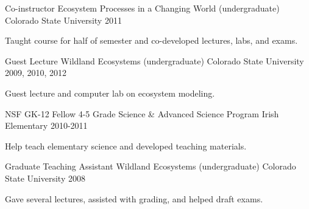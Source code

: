 \begin{cventries}
  \cventry
    {Co-instructor} %
    {Ecosystem Processes in a Changing World (undergraduate)} %
    {Colorado State University} %
    {2011} %
    {
      \begin{cvitems} %
        \item {Taught course for half of semester and co-developed lectures, labs, and exams.}
      \end{cvitems}
    }

  \cventry
    {Guest Lecture} %
    {Wildland Ecosystems (undergraduate)} %
    {Colorado State University} %
    {2009, 2010, 2012} %
    {
      \begin{cvitems} %
        \item {Guest lecture and computer lab on ecosystem modeling.}
      \end{cvitems}
    }

  \cventry
    {NSF GK-12 Fellow} %
    {4-5 Grade Science \& Advanced Science Program} %
    {Irish Elementary} %
    {2010-2011} %
    {
      \begin{cvitems} %
        \item {Help teach elementary science and developed teaching materials.}
      \end{cvitems}
    }


  \cventry
    {Graduate Teaching Assistant} %
    {Wildland Ecosystems (undergraduate)} %
    {Colorado State University} %
    {2008} %
    {
      \begin{cvitems} %
        \item {Gave several lectures, assisted with grading, and helped draft exams.}
      \end{cvitems}
    }

\end{cventries}
